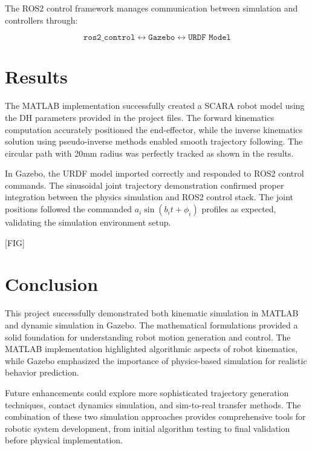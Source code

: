 \documentclass{article}
\begin{document}
The ROS2 control framework manages communication between simulation and controllers through:

\begin{equation}
\texttt{ros2\_control} \leftrightarrow \texttt{Gazebo} \leftrightarrow \texttt{URDF Model}
\end{equation}


\section{Results}

The MATLAB implementation successfully created a SCARA robot model using the DH parameters provided in the project files. The forward kinematics computation accurately positioned the end-effector, while the inverse kinematics solution using pseudo-inverse methods enabled smooth trajectory following. The circular path with 20mm radius was perfectly tracked as shown in the results.

In Gazebo, the URDF model imported correctly and responded to ROS2 control commands. The sinusoidal joint trajectory demonstration confirmed proper integration between the physics simulation and ROS2 control stack. The joint positions followed the commanded $a_i \sin(b_i t + \phi_i)$ profiles as expected, validating the simulation environment setup.

[FIG]

\section{Conclusion}

This project successfully demonstrated both kinematic simulation in MATLAB and dynamic simulation in Gazebo. The mathematical formulations provided a solid foundation for understanding robot motion generation and control. The MATLAB implementation highlighted algorithmic aspects of robot kinematics, while Gazebo emphasized the importance of physics-based simulation for realistic behavior prediction.

Future enhancements could explore more sophisticated trajectory generation techniques, contact dynamics simulation, and sim-to-real transfer methods. The combination of these two simulation approaches provides comprehensive tools for robotic system development, from initial algorithm testing to final validation before physical implementation.
\end{document}
